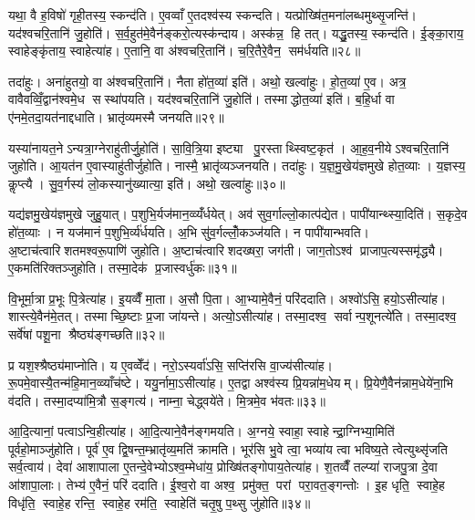 यथा॒ वै ह॒विषो॑ गृही॒तस्य॒ स्कन्द॑ति। ए॒वव्वाँ ए॒तदश्व॑स्य स्कन्दति। यत्प्रोख्षि॑त॒मना॑लब्धमुथ्सृ॒जन्ति॑। यद॑श्वचरि॒तानि॑ जु॒होति॑। स॒र्व॒हुत॑मे॒वैन॑ङ्करो॒त्यस्क॑न्दाय। अस्क॑न्न॒ हि तत्। यद्धु॒तस्य॒ स्कन्द॑ति। ई॒ङ्का॒राय॒ स्वाहेङ्कृ॑ताय॒ स्वाहेत्या॑ह। ए॒तानि॒ वा अ॑श्वचरि॒तानि॑। च॒रि॒तैरे॒वैन॒ सम॑र्धयति॥२८॥

तदा॑हुः। अना॑हुतयो॒ वा अ॑श्वचरि॒तानि॑। नैता हो॑त॒व्या॑ इति॑। अथो॒ खल्वा॑हुः। हो॒त॒व्या॑ ए॒व। अत्र॒ वावैवव्विँ॒द्वान॑श्वमे॒ध सस्था॑पयति। यद॑श्वचरि॒तानि॑ जु॒होति॑। तस्माद्धोत॒व्या॑ इति॑। ब॒हि॒र्धा वा ए॑नमे॒तदा॒यत॑नाद्दधाति। भ्रातृ॑व्यमस्मै जनयति॥२९॥

यस्या॑नायत॒नेऽन्यत्रा॒ग्नेराहु॑तीर्जु॒होति॑। सा॒वि॒त्रि॒या इष्ट्या पु॒रस्ताथ्स्विष्ट॒कृत॑। आ॒ह॒व॒नीयेऽश्वचरि॒तानि॑ जुहोति। आ॒यत॑न ए॒वास्याहु॑तीर्जुहोति। नास्मै॒ भ्रातृ॑व्यञ्जनयति। तदा॑हुः। य॒ज्ञ॒मु॒खेय॑ज्ञमुखे होत॒व्याः। य॒ज्ञस्य॒ कॢप्त्यै। सु॒व॒र्गस्य॑ लो॒कस्यानु॑ख्यात्या॒ इति॑। अथो॒ खल्वा॑हुः॥३०॥

यद्य॑ज्ञमु॒खेय॑ज्ञमुखे जुहु॒यात्। प॒शुभि॒र्यज॑मान॒व्व्यँ॑र्धयेत्। अव॑ सुव॒र्गाल्लो॒कात्प॑द्येत। पापी॑यान्थ्स्या॒दिति॑। स॒कृदे॒व हो॑त॒व्याः। न यज॑मानं प॒शुभि॒र्व्य॑र्धयति। अ॒भि सु॑व॒र्गल्लोँ॒कञ्ज॑यति। न पापी॑यान्भवति। अ॒ष्टाच॑त्वारिशतमश्वरू॒पाणि॑ जुहोति। अ॒ष्टाच॑त्वारिशदख्षरा॒ जग॑ती। जाग॒तोऽश्व॑ प्राजाप॒त्यस्समृ॑द्ध्यै। ए॒कमति॑रिक्तञ्जुहोति। तस्मा॒देक॑ प्र॒जास्वर्धु॑कः॥३१॥\anuvakamend[अ॒र्ध॒य॒ति॒ ज॒न॒य॒ति॒ खल्वा॑हु॒र्जग॑ती॒ त्रीणि॑ च]

वि॒भूर्मा॒त्रा प्र॒भूः पि॒त्रेत्या॑ह। इ॒यव्वैँ मा॒ता। अ॒सौ पि॒ता। आ॒भ्यामे॒वैनं॒ परि॑ददाति। अश्वो॑ऽसि॒ हयो॒ऽसीत्या॑ह। शास्त्ये॒वैन॑मे॒तत्। तस्माच्छि॒ष्टाः प्र॒जा जा॑यन्ते। अत्यो॒ऽसीत्या॑ह। तस्मा॒दश्व॒ सर्वान्प॒शूनत्ये॑ति। तस्मा॒दश्व॒ सर्वे॑षां पशू॒ना श्रैष्ठ्य॑ङ्गच्छति॥३२॥

प्र यश॒श्श्रैष्ठ्य॑माप्नोति। य ए॒वव्वेँद॑। नरो॒ऽस्यर्वा॑ऽसि॒ सप्ति॑रसि वा॒ज्य॑सीत्या॑ह। रू॒पमे॒वास्यै॒तन्म॑हि॒मान॒व्व्याँच॑ष्टे। ययु॒र्नामा॒ऽसीत्या॑ह। ए॒तद्वा अश्व॑स्य प्रि॒यन्ना॑म॒धेयम्। प्रि॒येणै॒वैन॑न्नाम॒धेये॑ना॒भि व॑दति। तस्मा॒दप्या॑मि॒त्रौ स॒ङ्गत्य॑। नाम्ना॒ चेद्ध्वये॑ते। मि॒त्रमे॒व भ॑वतः॥३३॥

आ॒दि॒त्यानां॒ पत्वाऽन्वि॒हीत्या॑ह। आ॒दि॒त्याने॒वैन॑ङ्गमयति। अ॒ग्नये॒ स्वाहा॒ स्वाहेन्द्रा॒ग्निभ्या॒मिति॑ पूर्वहो॒माञ्जु॑होति। पूर्व॑ ए॒व द्वि॒षन्त॒म्भ्रातृ॑व्य॒मति॑ क्रामति। भूर॑सि भु॒वे त्वा॒ भव्या॑य त्वा भविष्य॒ते त्वेत्युथ्सृ॑जति सर्व॒त्वाय॑। देवा॑ आशापाला ए॒तन्दे॒वेभ्योऽश्व॒म्मेधा॑य॒ प्रोख्षि॑तङ्गोपाय॒तेत्या॑ह। श॒तव्वैँ तल्प्या॑ राजपु॒त्रा दे॒वा आ॑शापा॒लाः। तेभ्य॑ ए॒वैनं॒ परि॑ ददाति। ई॒श्व॒रो वा अश्व॒ प्रमु॑क्त॒ परां परा॒वत॒ङ्गन्तोः। इ॒ह धृति॒ स्वाहे॒ह विधृ॑ति॒ स्वाहे॒ह रन्ति॒ स्वाहे॒ह रम॑ति॒ स्वाहेति॑ चतृ॒षु प॒थ्सु जु॑होति॥३४॥

